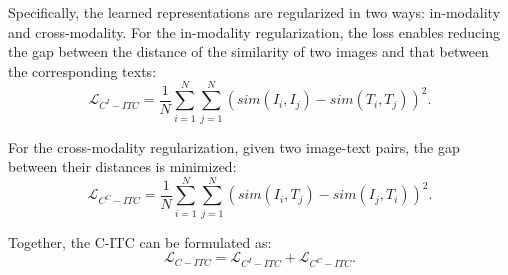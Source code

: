 \documentclass[letterpaper]{article} %
\begin{document}
Specifically, the learned representations are regularized in two ways: in-modality and cross-modality. 
For the in-modality regularization, the loss enables reducing the gap between the distance of the similarity of two images and that between the corresponding texts:
\begin{equation}
    \mathcal{L}_{C^I-ITC}
    = \frac{1}{N} \sum_{i=1}^N \sum_{j=1}^N (sim(I_i, I_j) - sim(T_i, T_j))^2.
\end{equation}

For the cross-modality regularization, given two image-text pairs, the gap between their distances is minimized:
\begin{equation}
    \mathcal{L}_{C^C-ITC}
    = \frac{1}{N} \sum_{i=1}^N \sum_{j=1}^N (sim(I_i, T_j) - sim(I_j, T_i))^2.
\end{equation}

Together, the C-ITC can be formulated as:
\begin{equation}
    \mathcal{L}_{C-ITC} = \mathcal{L}_{C^I-ITC} + \mathcal{L}_{C^C-ITC}.
\end{equation}




\end{document}

